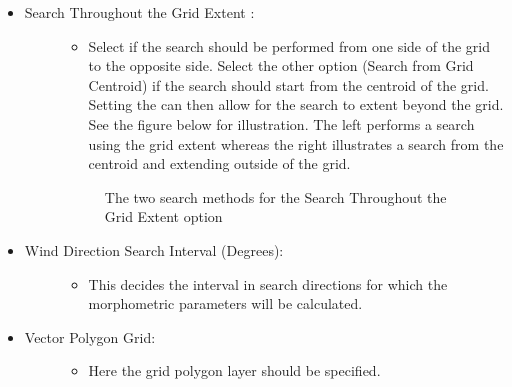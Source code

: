 \documentclass[letterpaper,10pt,english]{sphinxmanual}
\begin{document}
\begin{itemize}
\item {} \begin{description}
\item[{Search Throughout the Grid Extent :}] \leavevmode\begin{itemize}
\item {} 
Select if the search should be performed from one side of the grid to the opposite side. Select the other option (Search from Grid Centroid) if the search should start from the centroid of the grid. Setting the  can then allow for the search to extent beyond the grid. See the figure below for illustration. The left performs a search using the grid extent whereas the right illustrates a search from the centroid and extending outside of the grid.

\end{itemize}

\begin{figure}[htbp]
\centering
\capstart

\noindent{}
\caption{The two search methods for the Search Throughout the Grid Extent option}\label{\detokenize{pre-processor/Urban Land Cover Land Cover Fraction (Grid):id2}}\end{figure}

\end{description}

\item {} \begin{description}
\item[{Wind Direction Search Interval (Degrees):}] \leavevmode\begin{itemize}
\item {} 
This decides the interval in search directions for which the morphometric parameters will be calculated.

\end{itemize}

\end{description}

\item {} \begin{description}
\item[{Vector Polygon Grid:}] \leavevmode\begin{itemize}
\item {} 
Here the grid polygon layer should be specified.

\end{itemize}


\end{description}
\end{itemize}
\end{document}
